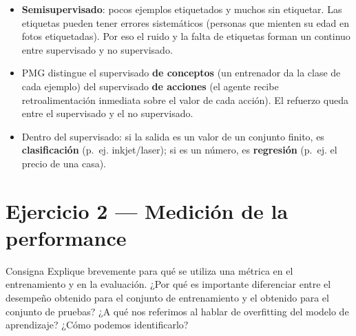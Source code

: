 \documentclass[11pt,a4paper]{article}
\begin{document}
\begin{extras}
\begin{itemize}
  \item \textbf{Semisupervisado}: pocos ejemplos etiquetados y muchos sin etiquetar. Las etiquetas pueden tener errores sistemáticos (personas que mienten su edad en fotos etiquetadas). Por eso el ruido y la falta de etiquetas forman un continuo entre supervisado y no supervisado.
  \item PMG distingue el supervisado \textbf{de conceptos} (un entrenador da la clase de cada ejemplo) del supervisado \textbf{de acciones} (el agente recibe retroalimentación inmediata sobre el valor de cada acción). El refuerzo queda entre el supervisado y el no supervisado.
  \item Dentro del supervisado: si la salida es un valor de un conjunto finito, es \textbf{clasificación} (p.~ej. inkjet/laser); si es un número, es \textbf{regresión} (p.~ej. el precio de una casa).
\end{itemize}
\end{extras}

\section{Ejercicio 2 --- Medición de la performance}

\begin{enunciado}{Consigna}
Explique brevemente para qué se utiliza una métrica en el entrenamiento y en la evaluación. ¿Por qué es importante diferenciar entre el desempeño obtenido para el conjunto de entrenamiento y el obtenido para el conjunto de pruebas? ¿A qué nos referimos al hablar de overfitting del modelo de aprendizaje? ¿Cómo podemos identificarlo?
\end{enunciado}
\end{document}
